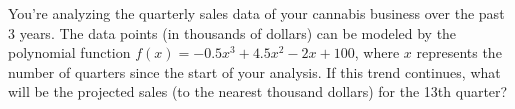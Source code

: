 \documentclass[border=10pt]{standalone}
\begin{document}
\begin{tcolorbox}[
    enhanced,
    colback=questionbg,
    colframe=questionborder,
    arc=8pt,
    boxrule=1.5pt,
    fontupper=\large\sffamily,
    width=0.95\textwidth
]
You're analyzing the quarterly sales data of your cannabis business over the past 3 years. The data points (in thousands of dollars) can be modeled by the polynomial function $f(x) = -0.5x^3 + 4.5x^2 - 2x + 100$, where $x$ represents the number of quarters since the start of your analysis. If this trend continues, what will be the projected sales (to the nearest thousand dollars) for the 13th quarter?
\end{tcolorbox}
\end{document}

